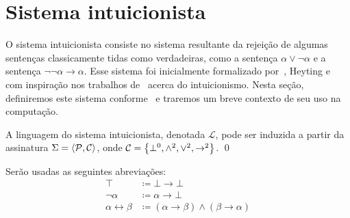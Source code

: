 \section{Sistema intuicionista}

    O sistema intuicionista consiste no sistema resultante da rejeição de algumas sentenças classicamente tidas como verdadeiras, como a sentença $\alpha\vee\neg\alpha$ e a sentença $\neg\neg\alpha\to\alpha$.
    Esse sistema foi inicialmente formalizado por~\cite{Kolmogorov}, Heyting e~\cite{Glivenko-A, Glivenko-B} com inspiração nos trabalhos de~\cite{Brouwer-A, Brouwer-B} acerca do intuicionismo.
    Nesta seção, definiremos este sistema conforme~\cite{Troelstra} e traremos um breve contexto de seu uso na computação.

    \begin{definition}[$\mathcal{L}$]
        A linguagem do sistema intuicionista, denotada $\mathcal{L}$, pode ser induzida a partir da assinatura $\Sigma=\langle\mathcal{P},\mathcal{C}\rangle$, onde $\mathcal{C}=\left\{\bot^0,\wedge^2,\vee^2,\to^2\right\}$.
        \qed{}
    \end{definition}

    \begin{notation}
        Serão usadas as seguintes abreviações:
        \begin{align*}
            \top&\coloneqq\bot\to\bot\\
            \neg\alpha&\coloneqq\alpha\to\bot\\
            \alpha\leftrightarrow\beta&\coloneqq(\alpha\to\beta)\wedge(\beta\to\alpha)
        \end{align*}
    \end{notation}


